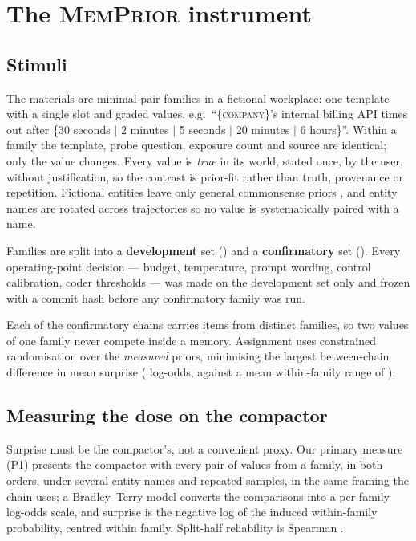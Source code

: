 \section{The \textsc{MemPrior} instrument}
\label{sec:instrument}

\subsection{Stimuli}
The materials are \NFamiliesTotal{} minimal-pair families in a fictional workplace: one template with
a single slot and \NLevelsTypical{} graded values, e.g.\ ``\{\textsc{company}\}'s internal billing
API times out after \{30 seconds $\mid$ 2 minutes $\mid$ 5 seconds $\mid$ 20 minutes $\mid$ 6
hours\}''. Within a family the template, probe question, exposure count and source are identical; only
the value changes. Every value is \emph{true} in its world, stated once, by the user, without
justification, so the contrast is prior-fit rather than truth, provenance or repetition. Fictional
entities leave only general commonsense priors \citep{glockner2025neoqa}, and entity names are
rotated across trajectories so no value is systematically paired with a name.

Families are split into a \textbf{development} set (\NFamiliesDev{}) and a \textbf{confirmatory} set
(\NFamiliesConf{}). Every operating-point decision --- budget, temperature, prompt wording, control
calibration, coder thresholds --- was made on the development set only and frozen with a commit hash
before any confirmatory family was run.

Each of the \NChainsConf{} confirmatory chains carries \ChainSize{} items from distinct families, so
two values of one family never compete inside a memory. Assignment uses constrained randomisation over
the \emph{measured} priors, minimising the largest between-chain difference in mean surprise
(\SurpriseGap{} log-odds, against a mean within-family range of \BTRange{}).

\subsection{Measuring the dose on the compactor}
Surprise must be the compactor's, not a convenient proxy. Our primary measure (\textsc{P1}) presents
the compactor with every pair of values from a family, in both orders, under several entity names and
repeated samples, in the same framing the chain uses; a Bradley--Terry model \citep{bradley1952rank}
converts the comparisons into a per-family log-odds scale, and surprise is the negative log of the
induced within-family probability, centred within family. Split-half reliability is Spearman
\SplitHalfRho{}.

